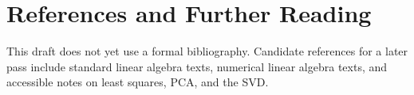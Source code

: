 \chapter{References and Further Reading}
\label{ch:references}

This draft does not yet use a formal bibliography. Candidate references for a
later pass include standard linear algebra texts, numerical linear algebra
texts, and accessible notes on least squares, PCA, and the SVD.
